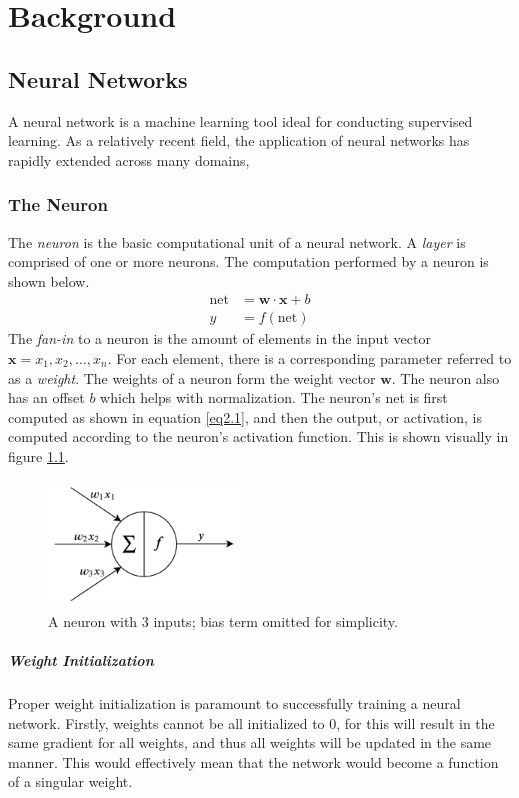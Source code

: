 \chapter{Background}\label{background}
\section{Neural Networks}
A neural network is a machine learning tool ideal for conducting supervised learning. As a relatively recent field, the application of neural networks has rapidly extended across many domains, 

\subsection{The Neuron}
The \textit{neuron} is the basic computational unit of a neural network. A \textit{layer} is comprised of one or more neurons. The computation performed by a neuron is shown below.
\begin{align}
\text{net} &= \mathbf{w \cdot x} + b\label{eq2.1}\\
y &= f(\text{net})
\end{align}
The \textit{fan-in} to a neuron is the amount of elements in the input vector $\mathbf{x} = x_1, x_2, \ldots, x_n$. For each element, there is a corresponding parameter referred to as a \textit{weight}. The weights of a neuron form the weight vector $\mathbf{w}$. The neuron also has an offset $b$ which helps with normalization. The neuron's net is first computed as shown in equation \ref{eq2.1}, and then the output, or activation, is computed according to the neuron's activation function. This is shown visually in figure \ref{neuron}.
\begin{figure}
	\centering
	\includegraphics[width=2in]{figures/neuron}
	\caption{A neuron with 3 inputs; bias term omitted for simplicity.}\label{neuron}
\end{figure}

\paragraph{Weight Initialization}
Proper weight initialization is paramount to successfully training a neural network. Firstly, weights cannot be all initialized to 0, for this will result in the same gradient for all weights, and thus all weights will be updated in the same manner. This would effectively mean that the network would become a function of a singular weight.

